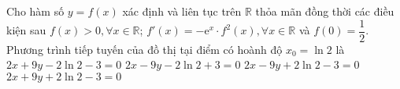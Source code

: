 \begin{ex}%
	Cho hàm số $y=f(x)$ xác định và liên tục trên $\mathbb{R}$ thỏa mãn đồng thời các điều kiện sau $f(x)>0, \forall x \in \mathbb{R}$; $f'(x)=-\mathrm{e}^x \cdot f^2 (x), \forall x \in \mathbb{R}$ và $f(0)=\dfrac{1}{2}$. Phương trình tiếp tuyến của đồ thị tại điểm có hoành độ $x_0= \ln 2$ là
	\choice
	{\True $2x+9y- 2\ln 2 -3 =0$}
	{$2x-9y- 2\ln 2 +3 =0$}
	{$2x-9y+ 2\ln 2 -3 =0$}
	{$2x+9y+ 2\ln 2 -3 =0$}
\end{ex}

